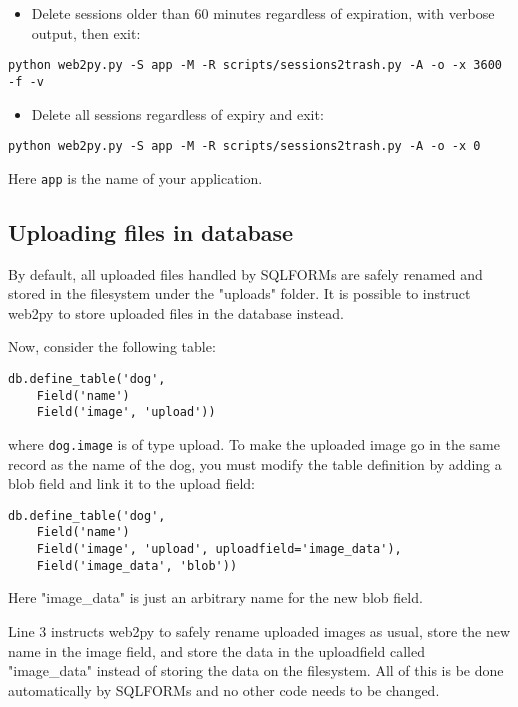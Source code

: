 \documentclass[justified,sixbynine,notoc]{tufte-book}
\def\ft{\small\tt}
\begin{document}
\begin{fullwidth}
\begin{itemize}
\item Delete sessions older than 60 minutes regardless of expiration, with verbose output, then exit:
\end{itemize}
\begin{lstlisting}
python web2py.py -S app -M -R scripts/sessions2trash.py -A -o -x 3600 -f -v
\end{lstlisting}

\begin{itemize}
\item Delete all sessions regardless of expiry and exit:
\end{itemize}
\begin{lstlisting}
python web2py.py -S app -M -R scripts/sessions2trash.py -A -o -x 0
\end{lstlisting}

Here {\ft app} is the name of your application.

\goodbreak\subsection{Uploading files in database}

By default, all uploaded files handled by SQLFORMs are safely renamed and stored in the filesystem under the "uploads" folder. It is possible to instruct web2py to store uploaded files in the database instead.

Now, consider the following table:

\begin{lstlisting}
db.define_table('dog',
    Field('name')
    Field('image', 'upload'))
\end{lstlisting}
\noindent where {\ft dog.image} is of type upload. To make the uploaded image go in the same record as the name of the dog, you must modify the table definition by adding a blob field and link it to the upload field:
\begin{lstlisting}
db.define_table('dog',
    Field('name')
    Field('image', 'upload', uploadfield='image_data'),
    Field('image_data', 'blob'))
\end{lstlisting}

Here "image\_data" is just an arbitrary name for the new blob field.

Line 3 instructs web2py to safely rename uploaded images as usual, store the new name in the image field, and store the data in the uploadfield called "image\_data" instead of storing the data on the filesystem. All of this is be done automatically by SQLFORMs and no other code needs to be changed.


\end{fullwidth}
\end{document}
